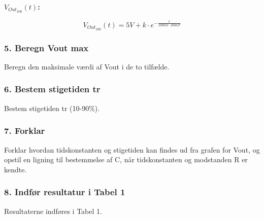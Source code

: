 \textbf{$V_{Out_{100}}(t)$:}
\begin{center}
\begin{equation}
V_{Out_{100}}(t) = 5V+k \cdot e^{-\frac{t}{100k\Omega \cdot 100nF}} 
\label{V_Out_100}
\end{equation}
\end{center}




\subsubsection*{5. Beregn Vout max}
Beregn den maksimale værdi af Vout i de to tilfælde.

\subsubsection*{6. Bestem stigetiden tr}
Bestem stigetiden tr (10-90\%).

\subsubsection*{7. Forklar}
Forklar hvordan tidskonstanten og stigetiden kan findes ud fra grafen for 	Vout, og opstil en ligning til bestemmelse af C, når tidskonstanten %
 og modstanden R er kendte.

\subsubsection*{8. Indfør resultatur i Tabel 1}
Resultaterne indføres i Tabel 1.

